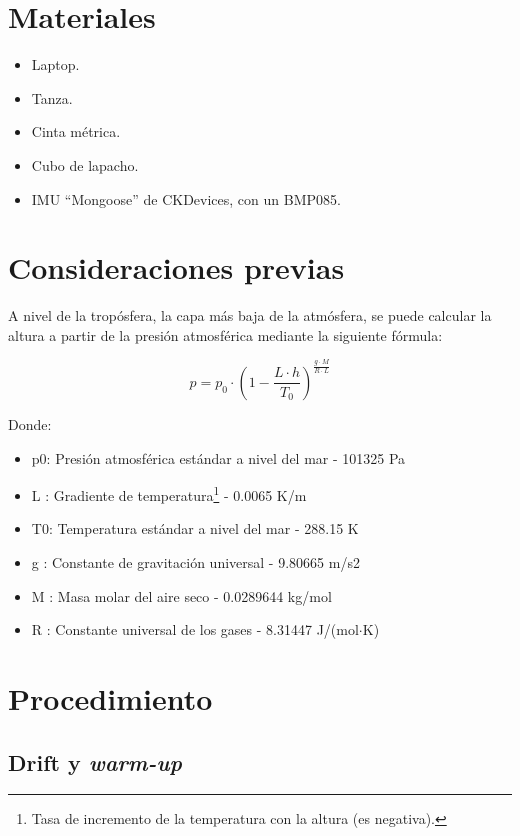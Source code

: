 \documentclass[spanish,12pt,a4paper,titlepage]{report}
\begin{document}
\newpage
\section{Materiales}
\label{sec:materiales}

\begin{itemize}
\item Laptop.
\item Tanza.
\item Cinta métrica.
\item Cubo de lapacho.
\item IMU ``Mongoose'' de CKDevices, con un BMP085.
\end{itemize}

\section{Consideraciones previas}
\label{consideraciones}

A nivel de la tropósfera, la capa más baja de la atmósfera, se puede calcular la altura a partir de la presión atmosférica mediante la siguiente fórmula\cite{bib:alt-press}:

\begin{equation}
  \label{eq:press-alt}
  p = p_0 \cdot \left(1 - \frac{L \cdot h}{T_0} \right)^\frac{g \cdot M}{R \cdot L}
\end{equation}

Donde:
\begin{itemize}
\item p0: 	Presión atmosférica estándar a nivel del mar -	101325 Pa
\item L :	Gradiente de temperatura\footnote{Tasa de incremento de la temperatura con la altura (es negativa).} -	0.0065 K/m
\item T0:	Temperatura estándar a nivel del mar -	288.15 K
\item g :	Constante de gravitación universal -	9.80665 m/s2
\item M :	Masa molar del aire seco -	0.0289644 kg/mol
\item R :	Constante universal de los gases - 	8.31447 J/(mol$\cdot$K)
\end{itemize}


\newpage
\section{Procedimiento}
\label{sec:procedimiento}

\subsection{Drift y \textit{warm-up}}
\label{sec:drift-y-warm-up}
\end{document}
